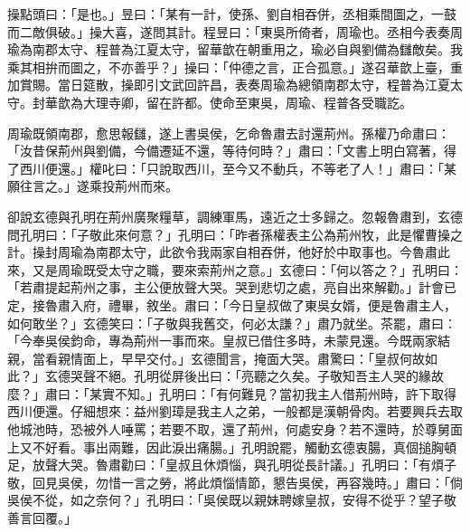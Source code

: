 操點頭曰：「是也。」昱曰：「某有一計，使孫、劉自相吞併，丞相乘間圖之，一鼓而二敵俱破。」操大喜，遂問其計。程昱曰：「東吳所倚者，周瑜也。丞相今表奏周瑜為南郡太守、程普為江夏太守，留華歆在朝重用之，瑜必自與劉備為讎敵矣。我乘其相拚而圖之，不亦善乎？」操曰：「仲德之言，正合孤意。」遂召華歆上臺，重加賞賜。當日筵散，操即引文武回許昌，表奏周瑜為總領南郡太守，程普為江夏太守。封華歆為大理寺卿，留在許都。使命至東吳，周瑜、程普各受職訖。

周瑜既領南郡，愈思報讎，遂上書吳侯，乞命魯肅去討還荊州。孫權乃命肅曰：「汝昔保荊州與劉備，今備遷延不還，等待何時？」肅曰：「文書上明白寫著，得了西川便還。」權叱曰：「只說取西川，至今又不動兵，不等老了人！」肅曰：「某願往言之。」遂乘投荊州而來。

卻說玄德與孔明在荊州廣聚糧草，調練軍馬，遠近之士多歸之。忽報魯肅到，玄德問孔明曰：「子敬此來何意？」孔明曰：「昨者孫權表主公為荊州牧，此是懼曹操之計。操封周瑜為南郡太守，此欲令我兩家自相吞併，他好於中取事也。今魯肅此來，又是周瑜既受太守之職，要來索荊州之意。」玄德曰：「何以答之？」孔明曰：「若肅提起荊州之事，主公便放聲大哭。哭到悲切之處，亮自出來解勸。」計會已定，接魯肅入府，禮畢，敘坐。肅曰：「今日皇叔做了東吳女婿，便是魯肅主人，如何敢坐？」玄德笑曰：「子敬與我舊交，何必太謙？」肅乃就坐。茶罷，肅曰：「今奉吳侯鈞命，專為荊州一事而來。皇叔已借住多時，未蒙見還。今既兩家結親，當看親情面上，早早交付。」玄德聞言，掩面大哭。肅驚曰：「皇叔何故如此？」玄德哭聲不絕。孔明從屏後出曰：「亮聽之久矣。子敬知吾主人哭的緣故麼？」肅曰：「某實不知。」孔明曰：「有何難見？當初我主人借荊州時，許下取得西川便還。仔細想來：益州劉璋是我主人之弟，一般都是漢朝骨肉。若要興兵去取他城池時，恐被外人唾罵；若要不取，還了荊州，何處安身？若不還時，於尊舅面上又不好看。事出兩難，因此淚出痛腸。」孔明說罷，觸動玄德衷腸，真個搥胸頓足，放聲大哭。魯肅勸曰：「皇叔且休煩惱，與孔明從長計議。」孔明曰：「有煩子敬，回見吳侯，勿惜一言之勞，將此煩惱情節，懇告吳侯，再容幾時。」肅曰：「倘吳侯不從，如之奈何？」孔明曰：「吳侯既以親妹聘嫁皇叔，安得不從乎？望子敬善言回覆。」

